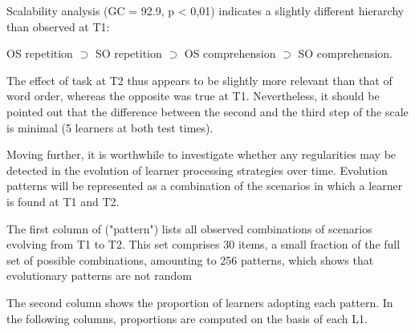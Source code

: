 Scalability analysis (GC = 92.9, p < 0,01) indicates a slightly different hierarchy than observed at T1:

OS repetition ${\supset}$ SO repetition ${\supset}$ OS comprehension ${\supset}$ SO comprehension. 

The effect of task at T2 thus appears to be slightly more relevant than that of word order, whereas the opposite was true at T1. Nevertheless, it should be pointed out that the difference between the second and the third step of the scale is minimal (5 learners at both test times).

Moving further, it is worthwhile to investigate whether any regularities may be detected in the evolution of learner processing strategies over time. Evolution patterns will be represented as a combination of the scenarios in which a learner is found at T1 and T2. 

The first column of  ("pattern") lists all observed combinations of scenarios evolving from T1 to T2. This set comprises 30 items, a small fraction of the full set of possible combinations, amounting to 256 patterns, which shows that evolutionary patterns are not random

The second column shows the proportion of learners adopting each pattern. In the following columns, proportions are computed on the basis of each L1.

